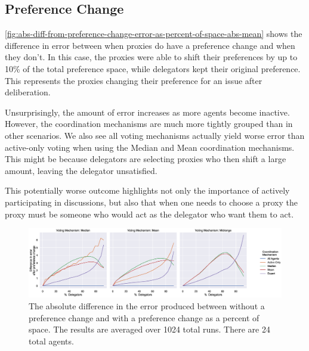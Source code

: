 \subsection{Preference Change}\label{subsec:results-shift}
\autoref{fig:abs-diff-from-preference-change-error-as-percent-of-space-abs-mean} shows
the difference in error between when proxies do have a preference change and when
they don't.
In this case, the proxies were able to shift their preferences by up to 10\% of the
total preference space, while delegators kept their original preference.
This represents the proxies changing their preference for an issue after deliberation.

Unsurprisingly, the amount of error increases as more agents become inactive.
However, the coordination mechanisms are much more tightly grouped than in other
scenarios.
We also see all voting mechanisms actually yield worse error than active-only
voting when using the Median and Mean coordination mechanisms.
This might be because delegators are selecting proxies who then shift a large amount,
leaving the delegator unsatisfied.

This potentially worse outcome highlights not only the importance of actively
participating in discussions, but also that when one needs to choose a proxy the
proxy must be someone who would act as the delegator who want them to act.

\begin{landscape}
    \begin{figure}[p]
        \centering
        \includegraphics[scale=0.55]
        {content/chapter2/figures/abs_diff_from_preference_change_error_as_percent_of_space_abs_mean}
        \caption{
            The absolute difference in the error produced between without a
            preference change and with a preference change as a percent of space.
            The results are averaged over 1024 total runs.
            There are 24 total agents.
        }
        \label{fig:abs-diff-from-preference-change-error-as-percent-of-space-abs-mean}
    \end{figure}
\end{landscape}
